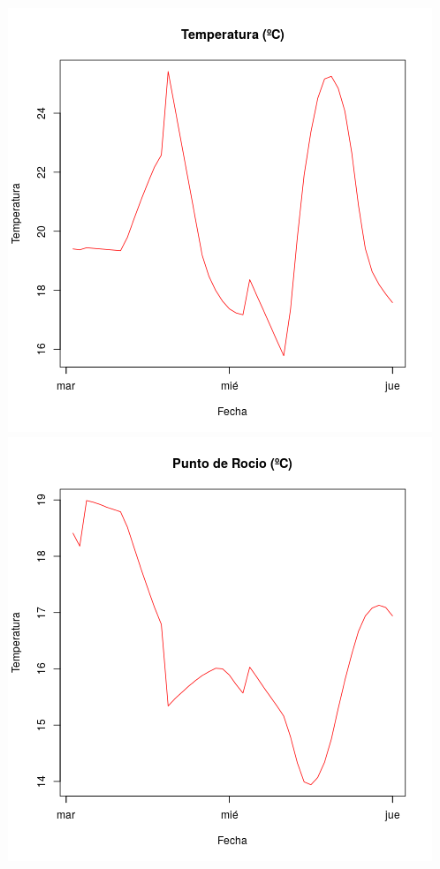 \documentclass{article}
\begin{document}
\begin{figure}[htb]
\begin{center}
   \includegraphics[scale=0.4]{temperatura.png}
   \includegraphics[scale=0.4]{rocio.png}

\end{center}
\end{figure}
\end{document}

